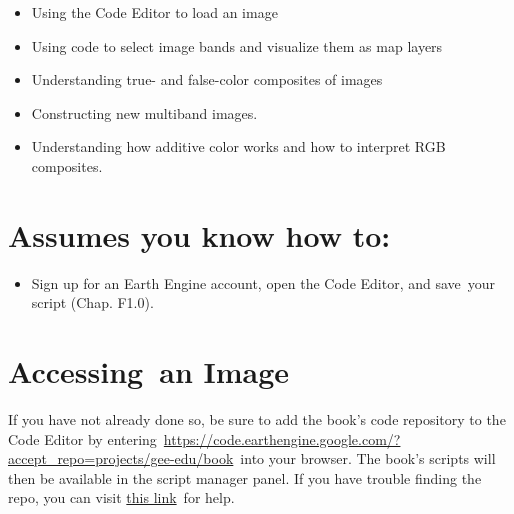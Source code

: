 \documentclass[
  letterpaper,
  DIV=11,
  numbers=noendperiod]{scrreprt}
\providecommand{\tightlist}{%
  \setlength{\itemsep}{0pt}\setlength{\parskip}{0pt}}\usepackage{longtable,booktabs,array}
\begin{document}

\begin{itemize}
\tightlist
\item
  Using the Code Editor to load an image
\item
  Using code to select image bands and visualize them as map layers
\item
  Understanding true- and false-color composites of images
\item
  Constructing new multiband images.
\item
  Understanding how additive color works and how to interpret RGB
  composites.
\end{itemize}

\hypertarget{assumes-you-know-how-to-1}{%
\section*{Assumes you know how to:}\label{assumes-you-know-how-to-1}}


\begin{itemize}
\tightlist
\item
  Sign up for an Earth Engine account, open the Code Editor, and
  save~your script (Chap. F1.0).
\end{itemize}

\hypertarget{accessing-an-image}{%
\section{Accessing~an Image}\label{accessing-an-image}}

If you have not already done so, be sure to add the book's code
repository to the Code Editor by
entering~\href{https://www.google.com/url?q=https://code.earthengine.google.com/?accept_repo\%3Dprojects/gee-edu/book\&sa=D\&source=editors\&ust=1670414092189999\&usg=AOvVaw1jWHeBmeq93I_lo_9useCA}{}\href{https://www.google.com/url?q=https://code.earthengine.google.com/?accept_repo\%3Dprojects/gee-edu/book\&sa=D\&source=editors\&ust=1670414092190705\&usg=AOvVaw3Z7cK8r6eOSYUceNjA8oUg}{https://code.earthengine.google.com/?accept\_repo=projects/gee-edu/book}~into
your browser. The book's scripts will then be available in the script
manager panel. If you have trouble finding the repo, you can visit
\href{https://www.google.com/url?q=https://docs.google.com/presentation/d/1Kt6wGNoesYm__Cu3k3bnlbbyPN6m9SF4hQHK-pIDHfc/edit\%23slide\%3Did.g18a7b4b055d_0_624\&sa=D\&source=editors\&ust=1670414092191415\&usg=AOvVaw2eETuRpR5worezkj7citx6}{this
link}~for help.
\end{document}
